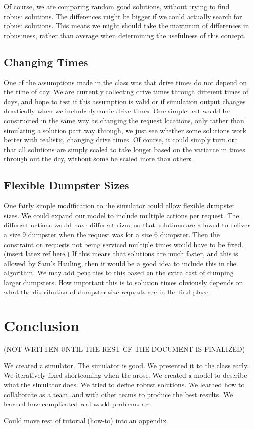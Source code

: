 \documentclass{article}
\begin{document}
Of course, we are comparing random good solutions, without trying to find robust solutions.
The differences might be bigger if we could actually search for robust solutions.
This means we might should take the maximum of differences in robustness, rather than average when determining the usefulness of this concept.


\subsection{Changing Times}
One of the assumptions made in the class was that drive times do not depend on the time of day.
We are currently collecting drive times through different times of days, and hope to test if this assumption is valid or if simulation output changes drastically when we include dynamic drive times.
One simple test would be constructed in the same way as changing the request locations, only rather than simulating a solution part way through, we just see whether some solutions work better with realistic, changing drive times.
Of course, it could simply turn out that all solutions are simply scaled to take longer based on the variance in times through out the day, without some be scaled more than others.

\subsection{Flexible Dumpster Sizes}
One fairly simple modification to the simulator could allow flexible dumpster sizes.
We could expand our model to include multiple actions per request.
The different actions would have different sizes, so that solutions are allowed to deliver a size $9$ dumpster when the request was for a size $6$ dumpster.
Then the constraint on requests not being serviced multiple times would have to be fixed. (insert latex ref here.)
If this means that solutions are much faster, and this is allowed by Sam's Hauling, then it would be a good idea to include this in the algorithm.
We may add penalties to this based on the extra cost of dumping larger dumpsters.
How important this is to solution times obviously depends on what the distribution of dumpster size requests are in the first place.

\section{Conclusion}

(NOT WRITTEN UNTIL THE REST OF THE DOCUMENT IS FINALIZED)

We created a simulator.
The simulator is good.
We presented it to the class early.
We iteratively fixed shortcoming when the arose.
We created a model to describe what the simulator does.
We tried to define robust solutions.
We learned how to collaborate as a team, and with other teams to produce the best results.
We learned how complicated real world problems are.


Could move rest of tutorial (how-to) into an appendix
\end{document}
